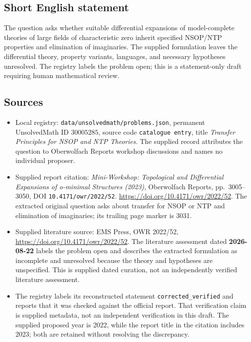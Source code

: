 \documentclass[11pt]{article}
\begin{document}
\subsection{Short English statement}
The question asks whether suitable differential expansions of model-complete theories of large fields of characteristic zero inherit specified NSOP/NTP properties and elimination of imaginaries. The supplied formulation leaves the differential theory, property variants, languages, and necessary hypotheses unresolved. The registry labels the problem open; this is a statement-only draft requiring human mathematical review.
\subsection{Sources}
\begin{itemize}
\item Local registry: \texttt{data/unsolvedmath/problems.json}, permanent UnsolvedMath ID \(30005285\), source code \texttt{catalogue entry}, title \emph{Transfer Principles for NSOP and NTP Theories}. The supplied record attributes the question to Oberwolfach Reports workshop discussions and names no individual proposer.
\item Supplied report citation: \emph{Mini-Workshop: Topological and Differential Expansions of o-minimal Structures (2023)}, Oberwolfach Reports, pp.\ 3005--3050, DOI \texttt{10.4171/owr/2022/52}. \url{https://doi.org/10.4171/owr/2022/52}. The extracted original question asks about transfer for NSOP or NTP and elimination of imaginaries; its trailing page marker is 3031.
\item Supplied literature source: EMS Press, OWR 2022/52, \url{https://doi.org/10.4171/owr/2022/52}. The literature assessment dated \textbf{2026-08-22} labels the problem open and describes the extracted formulation as incomplete and unresolved because the theory and hypotheses are unspecified. This is supplied dated curation, not an independently verified literature assessment.
\item The registry labels its reconstructed statement \texttt{corrected\_verified} and reports that it was checked against the official report. That verification claim is supplied metadata, not an independent verification in this draft. The supplied proposed year is 2022, while the report title in the citation includes 2023; both are retained without resolving the discrepancy.
\end{itemize}
\end{document}
